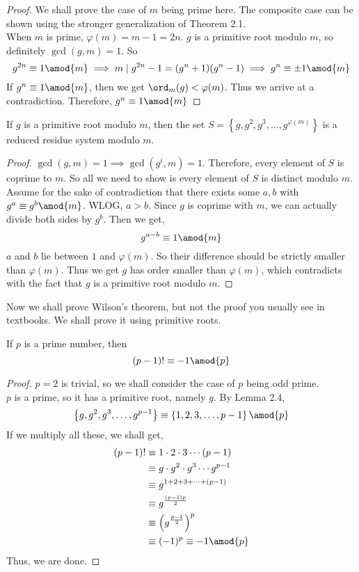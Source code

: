 \documentclass[11pt]{scrartcl}
\begin{document}
\begin{proof}
We shall prove the case of \(m\) being prime here. The composite case can be shown using the stronger generalization of Theorem 2.1. \\
When \(m\) is prime, \(\varphi(m)=m-1=2n\). \(g\) is a primitive root modulo \(m\), so definitely \(\gcd(g,m)=1\). So
\[g^{2n} \equiv 1 \amod{m} \implies m \mid g^{2n}-1 = (g^n+1)(g^n-1) \implies g^n \equiv \pm 1 \amod{m}\]
If \(g^n \equiv 1 \amod{m}\), then we get \(\ord_m(g) < \varphi(m)\). Thus we arrive at a contradiction. Therefore, \(g^n \equiv 1 \amod{m}\)
\end{proof}
\begin{lemma}
If \(g\) is a primitive root modulo \(m\), then the set \(S = \left\{ g, g^2, g^3, \ldots, g^{\varphi(m)} \right\} \) is a reduced residue system modulo \(m\).
\end{lemma}
\begin{proof}
\(\gcd(g,m) = 1 \implies \gcd(g^{i},m) = 1\). Therefore, every element of \(S\) is coprime to \(m\). So all we need to show is every element of \(S\) is distinct modulo \(m\). \\
Assume for the sake of contradiction that there exists some \(a,b\) with \(g^{a} \equiv g^b \amod{m}\). WLOG, \(a>b\). Since \(g\) is coprime with \(m\), we can actually divide both sides by \(g^b\). Then we get,
\[g^{a-b} \equiv 1 \amod{m}\]
\(a\) and \(b\) lie between \(1\) and \(\varphi(m)\). So their difference should be strictly smaller than \(\varphi(m)\). Thus we get \(g\) has order smaller than \(\varphi(m)\), which contradicts with the fact that \(g\) is a primitive root modulo \(m\).
\end{proof}
Now we shall prove Wilson's theorem, but not the proof you usually see in textbooks. We shall prove it using primitive roots.
\begin{theorem}
If \(p\) is a prime number, then
\[(p-1)! \equiv -1 \amod{p}\]
\end{theorem}
\begin{proof}
\(p=2\) is trivial, so we shall consider the case of \(p\) being odd prime.\\
\(p\) is a prime, so it has a primitive root, namely \(g\). By Lemma 2.4,
\[\left\{ g, g^2, g^3, \ldots, g^{p-1} \right\} \equiv \left\{ 1,2,3,\ldots, p-1 \right\} \amod{p}\]
If we multiply all these, we shall get,
\begin{equation*}
\begin{split}
(p-1)! &\equiv 1 \cdot 2 \cdot 3 \cdots (p-1) \\
&\equiv g \cdot g^2 \cdot g^3 \cdots g^{p-1} \\
&\equiv g^{1+2+3+\cdots+(p-1)} \\
&\equiv g^{\frac{(p-1)p}{2}} \\
&\equiv \left(g^{\frac{p-1}{2}}\right)^p \\
&\equiv (-1)^p \equiv -1 \amod{p}
\end{split}
\end{equation*}
Thus, we are done.
\end{proof}
\end{document}
